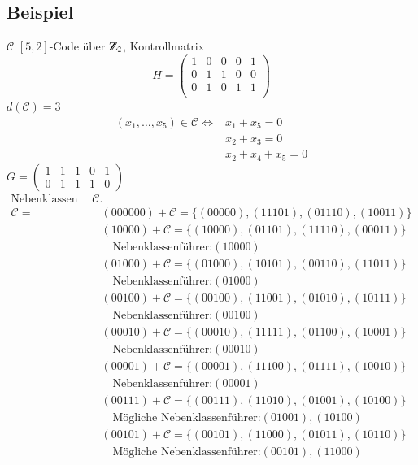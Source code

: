 \subsection{Beispiel}
$\mathcal{C}$ $[5,2]$-Code \"uber $\Z_2$, Kontrollmatrix
\[
	H=
	\begin{pmatrix}
		1 & 0 & 0 & 0 & 1\\
		0 & 1 & 1 & 0 & 0\\
		0 & 1 & 0 & 1 & 1\\
	\end{pmatrix}
\]
$d(\mathcal{C})=3$\\
\begin{align*}
(x_1,\ldots,x_5) \in \mathcal{C} \Leftrightarrow &x_1+x_5 = 0\\
& x_2+x_3=0\\
&x_2+x_4+x_5=0
\end{align*}
$G=
\begin{pmatrix}
	1 & 1 & 1 & 0 & 1\\
	0 & 1 & 1 & 1 &0
\end{pmatrix}$\\
\begin{align*}
\text{Nebenklassen von } \mathcal{C}.\\
\mathcal{C} = &(000000) + \mathcal{C} = \lbrace (00000),(11101),(01110),(10011) \rbrace\\
					  &(10000) + \mathcal{C} = \lbrace (10000),(01101),(11110),(00011) \rbrace\\
					  &\quad \text{Nebenklassenf\"uhrer:} (10000)\\
					  &(01000) + \mathcal{C} = \lbrace (01000),(10101),(00110),(11011) \rbrace\\
					  &\quad \text{Nebenklassenf\"uhrer:} (01000)\\
					  &(00100) + \mathcal{C} = \lbrace (00100),(11001),(01010),(10111) \rbrace\\
					  &\quad \text{Nebenklassenf\"uhrer:} (00100)\\
					  &(00010) + \mathcal{C} = \lbrace (00010),(11111),(01100),(10001) \rbrace\\
					  &\quad \text{Nebenklassenf\"uhrer:} (00010)\\
					  &(00001) + \mathcal{C} = \lbrace (00001),(11100),(01111),(10010) \rbrace\\
					  &\quad \text{Nebenklassenf\"uhrer:} (00001)\\
					  &(00111) + \mathcal{C} = \lbrace (00111),(11010),(01001),(10100) \rbrace\\
					  &\quad \text{M\"ogliche Nebenklassenf\"uhrer:} (01001), (10100)\\
					  &(00101) + \mathcal{C} = \lbrace (00101),(11000),(01011),(10110) \rbrace\\
					  &\quad \text{M\"ogliche Nebenklassenf\"uhrer:} (00101), (11000)\\
\end{align*}
